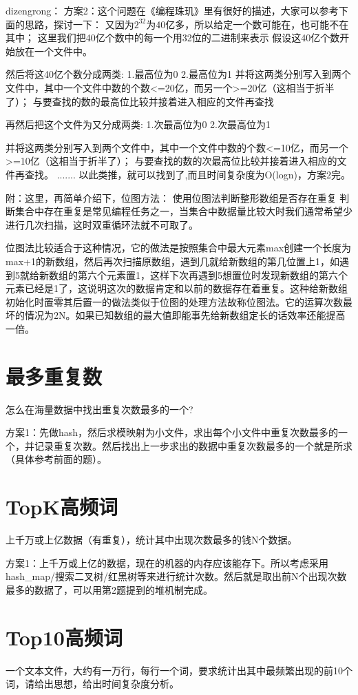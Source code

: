 dizengrong：
方案2：这个问题在《编程珠玑》里有很好的描述，大家可以参考下面的思路，探讨一下：
又因为$2^32$为40亿多，所以给定一个数可能在，也可能不在其中；
这里我们把40亿个数中的每一个用32位的二进制来表示
假设这40亿个数开始放在一个文件中。

然后将这40亿个数分成两类:
1.最高位为0
2.最高位为1
并将这两类分别写入到两个文件中，其中一个文件中数的个数<=20亿，而另一个>=20亿（这相当于折半了）；
与要查找的数的最高位比较并接着进入相应的文件再查找

再然后把这个文件为又分成两类:
1.次最高位为0
2.次最高位为1

并将这两类分别写入到两个文件中，其中一个文件中数的个数<=10亿，而另一个>=10亿（这相当于折半了）；
与要查找的数的次最高位比较并接着进入相应的文件再查找。
.......
以此类推，就可以找到了,而且时间复杂度为O(logn)，方案2完。

附：这里，再简单介绍下，位图方法：
使用位图法判断整形数组是否存在重复 
判断集合中存在重复是常见编程任务之一，当集合中数据量比较大时我们通常希望少进行几次扫描，这时双重循环法就不可取了。

位图法比较适合于这种情况，它的做法是按照集合中最大元素max创建一个长度为max+1的新数组，然后再次扫描原数组，遇到几就给新数组的第几位置上1，如遇到5就给新数组的第六个元素置1，这样下次再遇到5想置位时发现新数组的第六个元素已经是1了，这说明这次的数据肯定和以前的数据存在着重复。这种给新数组初始化时置零其后置一的做法类似于位图的处理方法故称位图法。它的运算次数最坏的情况为2N。如果已知数组的最大值即能事先给新数组定长的话效率还能提高一倍。



\section{最多重复数}
怎么在海量数据中找出重复次数最多的一个?

方案1：先做hash，然后求模映射为小文件，求出每个小文件中重复次数最多的一个，并记录重复次数。然后找出上一步求出的数据中重复次数最多的一个就是所求（具体参考前面的题）。

\section{TopK高频词}
上千万或上亿数据（有重复），统计其中出现次数最多的钱N个数据。

方案1：上千万或上亿的数据，现在的机器的内存应该能存下。所以考虑采用hash_map/搜索二叉树/红黑树等来进行统计次数。然后就是取出前N个出现次数最多的数据了，可以用第2题提到的堆机制完成。

\section{Top10高频词}
一个文本文件，大约有一万行，每行一个词，要求统计出其中最频繁出现的前10个词，请给出思想，给出时间复杂度分析。

